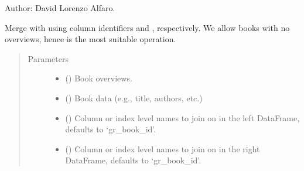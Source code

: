 \documentclass[letterpaper,10pt,english]{sphinxmanual}
\begin{document}
Author: David Lorenzo Alfaro.

\begin{fulllineitems}
\label{\detokenize{code:code_utils.utils.append_overviews_to_data}}
Merge  with  using column identifiers  and
, respectively. We allow books with no overviews, hence 
is the most suitable operation.
\begin{quote}\begin{description}
\item[{Parameters}] \leavevmode\begin{itemize}
\item {} 
 () \textendash{} Book overviews.

\item {} 
 () \textendash{} Book data (e.g., title, authors, etc.)

\item {} 
 (\sphinxstyleliteralemphasis{\sphinxupquote{, }}) \textendash{} Column or index level names to join on in the left DataFrame,
defaults to ‘gr\_book\_id’.

\item {} 
 (\sphinxstyleliteralemphasis{\sphinxupquote{, }}) \textendash{} Column or index level names to join on in the right DataFrame,
defaults to ‘gr\_book\_id’.


\end{itemize}
\end{description}
\end{quote}
\end{fulllineitems}
\end{document}
